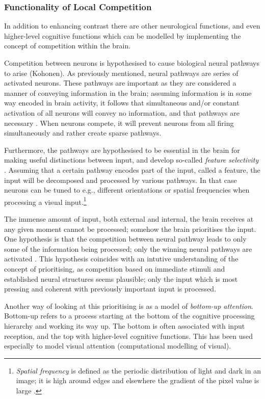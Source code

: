         
    \subsubsection{Functionality of Local Competition}
        In addition to enhancing contrast there are other neurological functions, and even higher-level cognitive functions which can be modelled by implementing the concept of competition within the brain.
        
        Competition between neurons is hypothesised to cause biological neural pathways to arise (Kohonen).
        As previously mentioned, neural pathways are series of activated neurons. These pathways are important as they are considered a manner of conveying information in the brain; assuming information is in some way encoded in brain activity, it follows that simultaneous and/or constant activation of all neurons will convey no information, and that pathways are necessary \citep{Chen}. When neurons compete, it will prevent neurons from all firing simultaneously and rather create sparse pathways. 
        
        Furthermore, the pathways are hypothesised to be essential in the brain for making useful distinctions between input, and develop so-called \textit{feature selectivity} \citep{Chen}. Assuming that a certain pathway encodes part of the input, called a feature, the input will be decomposed and processed by various pathways. In that case neurons can be tuned to e.g., different orientations or spatial frequencies when processing a visual input.\footnote{\textit{Spatial frequency} is defined as the periodic distribution of light and dark in an image; it is high around edges and elsewhere the gradient of the pixel value is large .}
        
        The immense amount of input, both external and internal, the brain receives at any given moment cannot be processed; somehow the brain prioritises the input. One hypothesis is that the competition between neural pathway leads to only some of the information being processed; only the winning neural pathways are activated \citep{Chen}. This hypothesis coincides with an intutive understanding of the concept of prioritising, as competition based on immediate stimuli and established neural structures seems plausible; only the input which is most pressing and coherent with previously important input is processed. 
        
        Another way of looking at this prioritising is as a model of \textit{bottom-up attention}. Bottom-up refers to a process starting at the bottom of the cognitive processing hierarchy and working its way up. The bottom is often associated with input reception, and the top with higher-level cognitive functions.  This has been used especially to model visual attention (computational modelling of visual). 

